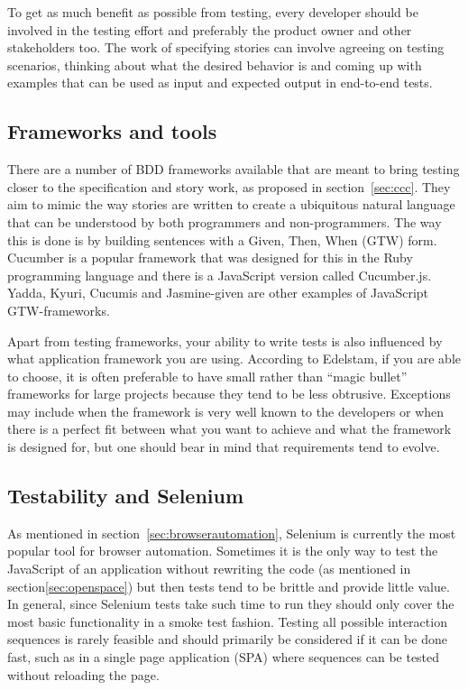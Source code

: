 \documentclass[11pt]{article}
\begin{document}
To get as much benefit as possible from testing, every developer should be involved in the testing effort and preferably the product owner and other stakeholders too. The work of specifying stories can involve agreeing on testing scenarios, thinking about what the desired behavior is and coming up with examples that can be used as input and expected output in end-to-end tests. \cite[questions~39-40]{Edelstam}

\subsection{Frameworks and tools}

There are a number of BDD frameworks available that are meant to bring testing closer to the specification and story work, as proposed in section~\ref{sec:ccc}. They aim to mimic the way stories are written to create a ubiquitous natural language that can be understood by both programmers and non-programmers. The way this is done is by building sentences with a Given, Then, When (GTW) form. Cucumber is a popular framework that was designed for this in the Ruby programming language and there is a JavaScript version called Cucumber.js. Yadda, Kyuri, Cucumis and Jasmine-given are other examples of JavaScript GTW-frameworks. \cite[section 8.4]{BDDJS}\cite{Cucumis}

Apart from testing frameworks, your ability to write tests is also influenced by what application framework you are using. According to Edelstam, if you are able to choose, it is often preferable to have small rather than ``magic bullet'' frameworks for large projects because they tend to be less obtrusive. Exceptions may include when the framework is very well known to the developers or when there is a perfect fit between what you want to achieve and what the framework is designed for, but one should bear in mind that requirements tend to evolve. \cite[questions~48-50]{Edelstam}

\subsection{Testability and Selenium}

As mentioned in section~\ref{sec:browserautomation}, Selenium is currently the most popular tool for browser automation. Sometimes it is the only way to test the JavaScript of an application without rewriting the code (as mentioned in section\ref{sec:openspace}) but then tests tend to be brittle and provide little value. In general, since Selenium tests take such time to run they should only cover the most basic functionality in a smoke test fashion. Testing all possible interaction sequences is rarely feasible and should primarily be considered if it can be done fast, such as in a single page application (SPA) where sequences can be tested without reloading the page. \cite[question~44]{Edelstam}
\end{document}
